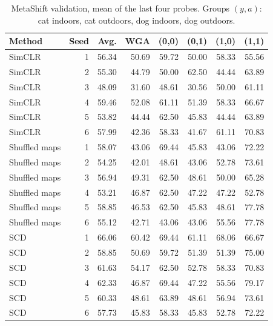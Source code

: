 \documentclass[11pt]{article}
\begin{document}
\begin{table}[H]
\centering\small
\setlength{\tabcolsep}{4pt}
\caption{MetaShift validation, mean of the last four probes. Groups $(y,a)$: cat indoors, cat outdoors, dog indoors,
dog outdoors.}
\begin{tabular}{lrrrrrrr}
\toprule
Method & Seed & Avg. & WGA & (0,0) & (0,1) & (1,0) & (1,1) \\
\midrule
SimCLR & 1 & 56.34 & 50.69 & 59.72 & 50.00 & 58.33 & 55.56 \\
SimCLR & 2 & 55.30 & 44.79 & 50.00 & 62.50 & 44.44 & 63.89 \\
SimCLR & 3 & 48.09 & 31.60 & 48.61 & 30.56 & 50.00 & 61.11 \\
SimCLR & 4 & 59.46 & 52.08 & 61.11 & 51.39 & 58.33 & 66.67 \\
SimCLR & 5 & 53.82 & 44.44 & 62.50 & 45.83 & 44.44 & 63.89 \\
SimCLR & 6 & 57.99 & 42.36 & 58.33 & 41.67 & 61.11 & 70.83 \\
\addlinespace
Shuffled maps & 1 & 58.07 & 43.06 & 69.44 & 45.83 & 43.06 & 72.22 \\
Shuffled maps & 2 & 54.25 & 42.01 & 48.61 & 43.06 & 52.78 & 73.61 \\
Shuffled maps & 3 & 56.94 & 49.31 & 62.50 & 48.61 & 50.00 & 65.28 \\
Shuffled maps & 4 & 53.21 & 46.87 & 62.50 & 47.22 & 47.22 & 52.78 \\
Shuffled maps & 5 & 58.85 & 46.53 & 62.50 & 45.83 & 48.61 & 77.78 \\
Shuffled maps & 6 & 55.12 & 42.71 & 43.06 & 43.06 & 55.56 & 77.78 \\
\addlinespace
SCD & 1 & 66.06 & 60.42 & 69.44 & 61.11 & 68.06 & 66.67 \\
SCD & 2 & 58.85 & 50.69 & 59.72 & 51.39 & 51.39 & 75.00 \\
SCD & 3 & 61.63 & 54.17 & 62.50 & 52.78 & 58.33 & 70.83 \\
SCD & 4 & 62.33 & 46.87 & 69.44 & 47.22 & 55.56 & 79.17 \\
SCD & 5 & 60.33 & 48.61 & 63.89 & 48.61 & 56.94 & 73.61 \\
SCD & 6 & 57.73 & 45.83 & 58.33 & 45.83 & 52.78 & 72.22 \\
\bottomrule
\end{tabular}
\end{table}
\end{document}
